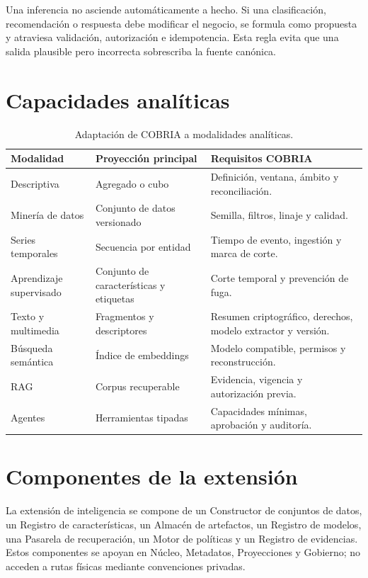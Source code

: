Una inferencia no asciende automáticamente a hecho. Si una clasificación, recomendación
o respuesta debe modificar el negocio, se formula como propuesta y atraviesa validación,
autorización e idempotencia. Esta regla evita que una salida plausible pero incorrecta
sobrescriba la fuente canónica.

\section{Capacidades analíticas}

\begin{table}[H]
\centering
\caption{Adaptación de COBRIA a modalidades analíticas.}
\label{tab:capacidades-analiticas}
\begin{tabularx}{\textwidth}{p{3.2cm}p{4cm}X}
\toprule
Modalidad & Proyección principal & Requisitos COBRIA \\
\midrule
Descriptiva & Agregado o cubo & Definición, ventana, ámbito y reconciliación.\\
Minería de datos & Conjunto de datos versionado & Semilla, filtros, linaje y calidad.\\
Series temporales & Secuencia por entidad & Tiempo de evento, ingestión y marca de corte.\\
Aprendizaje supervisado & Conjunto de características y etiquetas & Corte temporal y prevención de fuga.\\
Texto y multimedia & Fragmentos y descriptores & Resumen criptográfico, derechos, modelo extractor y versión.\\
Búsqueda semántica & Índice de embeddings & Modelo compatible, permisos y reconstrucción.\\
RAG & Corpus recuperable & Evidencia, vigencia y autorización previa.\\
Agentes & Herramientas tipadas & Capacidades mínimas, aprobación y auditoría.\\
\bottomrule
\end{tabularx}
\end{table}

\section{Componentes de la extensión}

La extensión de inteligencia se compone de un Constructor de conjuntos de datos, un Registro de características, un
Almacén de artefactos, un Registro de modelos, una Pasarela de recuperación, un Motor de políticas y un Registro
de evidencias. Estos componentes se apoyan en Núcleo, Metadatos, Proyecciones y Gobierno; no
acceden a rutas físicas mediante convenciones privadas.

